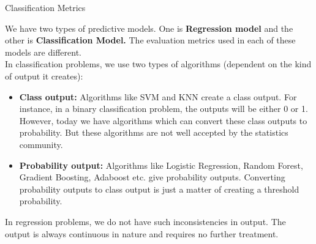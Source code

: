 \documentclass{beamer}
\begin{document}
\begin{frame}{Classification Metrics}
\begin{flushleft}
	We have two types of predictive models. One is \textbf{Regression model} and the other is \textbf{Classification Model.} The evaluation metrics used in each of these models are different. \\
\vspace{5pt}
In classification problems, we use two types of algorithms (dependent on the kind of output it creates):
\begin{itemize}
	\item \textbf{Class output:} Algorithms like SVM and KNN create a class output. For instance, in a binary classification problem, the outputs will be either 0 or 1. However, today we have algorithms which can convert these class outputs to probability. But these algorithms are not well accepted by the statistics community.
	\item \textbf{Probability output:} Algorithms like Logistic Regression, Random Forest, Gradient Boosting, Adaboost etc. give probability outputs. Converting probability outputs to class output is just a matter of creating a threshold probability.
\end{itemize}
In regression problems, we do not have such inconsistencies in output. The output is always continuous in nature and requires no further treatment.
\end{flushleft}
\end{frame}
\end{document}
